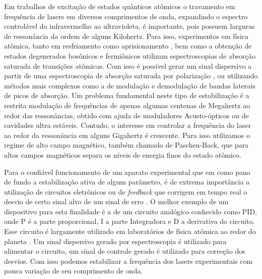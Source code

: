 \justifying
Em trabalhos de excitação de estados quânticos atômicos o travamento em frequência de lasers em diversos comprimentos de onda, expandindo o espectro controlável do infravermelho ao ultravioleta, é importante, pois possuem larguras de ressonância da ordem de alguns Kilohertz. Para isso, experimentos em física atômica, tanto em resfriamento como aprisionamento \cite{PhysRevA.90.023413}, bem como a obtenção de estados degenerados bosônicos e fermiônicos utilizam espectroscopias de absorção saturada de transições atômicas. Com isso é possível gerar um sinal dispersivo a partir de uma espectroscopia de absorção saturada por polarização \cite{4photonarxiv}, ou utilizando métodos mais complexos como a de modulação e demodulação de bandas laterais de picos de absorção. Um problema fundamental neste tipo de estabilização é a restrita modulação de frequências de apenas algumas centenas de Megahertz ao redor das ressonâncias, obtido com ajuda de moduladores Acusto-ópticos ou de cavidades ultra estáveis. Contudo, o interesse em controlar a frequência do laser ao redor da ressonância em alguns Gigahertz é crescente. Para isso utilizamos o regime de alto campo magnético, também chamado de Paschen-Back\cite{PhysRevA.93.043854}, que para altos campos magnéticos separa os níveis de energia finos do estado atômico.\par
Para o confiável funcionamento de um aparato experimental que em como pano de fundo a estabilização ativa de algum parâmetro, é de extrema importância a utilização de circuitos eletrônicos ou de \textit{feedback} que corrigem em tempo real o desvio de certo sinal alvo de um sinal de erro \cite{RevModPhys.77.783}. O melhor exemplo de um dispositivo para esta finalidade é a de um circuito analógico conhecido como PID, onde P é a parte proporcional, I a parte Integradora e D a derivativa do circuito. Esse circuito é largamente utilizado em laboratórios de física atômica ao redor do planeta \cite{florian:Thesis:2015}. Um sinal dispersivo gerado por espectroscopia é utilizado para alimentar o circuito, um sinal de controle gerado é utilizado para correção dos desvios. Com isso podemos estabilizar a frequência dos lasers experimentais com pouca variação de seu comprimento de onda.\\